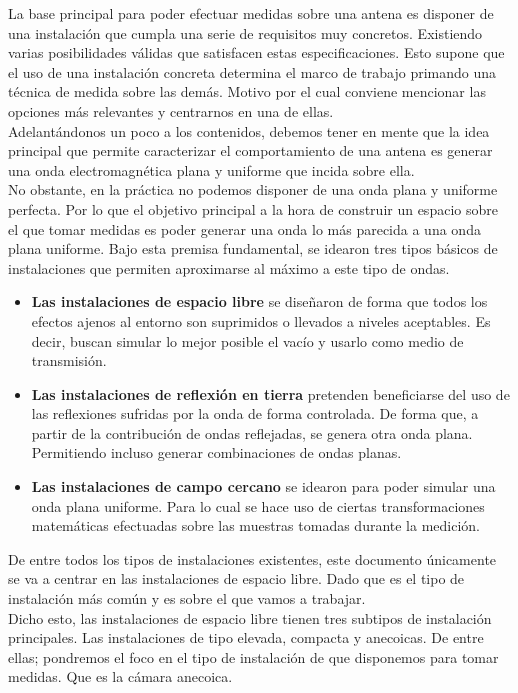 \documentclass{article}
\begin{document}
La base principal para poder efectuar medidas sobre una antena es disponer de una instalación que cumpla una serie de requisitos muy concretos. Existiendo varias posibilidades válidas que satisfacen estas especificaciones. 
Esto supone que el uso de una instalación concreta determina el marco de trabajo primando una técnica de medida sobre las demás. Motivo por el cual conviene mencionar las opciones más relevantes y centrarnos en una de ellas. 
\\

Adelantándonos un poco a los contenidos, debemos tener en mente que la idea principal que permite caracterizar el comportamiento de una antena es generar una onda electromagnética plana y uniforme que incida sobre ella. 
\\

No obstante, en la práctica no podemos disponer de una onda plana y uniforme perfecta. Por lo que el objetivo principal a la hora de construir un espacio sobre el que tomar medidas es poder generar una onda lo más parecida a una onda plana uniforme. 
Bajo esta premisa fundamental, se idearon tres tipos básicos de instalaciones que permiten aproximarse al máximo a este tipo de ondas. 

\begin{itemize}
    \item \textbf{Las instalaciones de espacio libre} se diseñaron de forma que todos los efectos ajenos al entorno son suprimidos o llevados a niveles aceptables. Es decir, buscan simular lo mejor posible el vacío y usarlo como medio de transmisión. 
    \item \textbf{Las instalaciones de reflexión en tierra} pretenden beneficiarse del uso de las reflexiones sufridas por la onda de forma controlada. De forma que, a partir de la contribución de ondas reflejadas, se genera otra onda plana. Permitiendo incluso generar combinaciones de ondas planas. 
    \item \textbf{Las instalaciones de campo cercano} se idearon para poder simular una onda plana uniforme. Para lo cual se hace uso de ciertas transformaciones matemáticas efectuadas sobre las muestras tomadas durante la medición. 
\end{itemize}
De entre todos los tipos de instalaciones existentes, este documento únicamente se va a centrar en las instalaciones de espacio libre. Dado que es el tipo de instalación más común y es sobre el que vamos a trabajar.\\
Dicho esto, las instalaciones de espacio libre tienen tres subtipos de instalación principales. Las instalaciones de tipo elevada, compacta y anecoicas. De entre ellas; pondremos el foco en el tipo de instalación de que disponemos para tomar medidas. Que es la cámara anecoica. 
\end{document}
